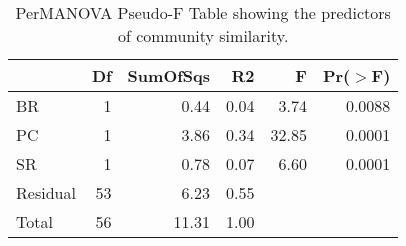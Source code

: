 \begin{table}[ht]
\centering
\begin{tabular}{lrrrrr}
  \hline
 & Df & SumOfSqs & R2 & F & Pr($>$F) \\ 
  \hline
BR & 1 & 0.44 & 0.04 & 3.74 & 0.0088 \\ 
  PC & 1 & 3.86 & 0.34 & 32.85 & 0.0001 \\ 
  SR & 1 & 0.78 & 0.07 & 6.60 & 0.0001 \\ 
  Residual & 53 & 6.23 & 0.55 &  &  \\ 
  Total & 56 & 11.31 & 1.00 &  &  \\ 
   \hline
\end{tabular}
\caption{PerMANOVA Pseudo-F Table showing the predictors of community similarity.} 
\label{tab:com_ng_perm}
\end{table}
